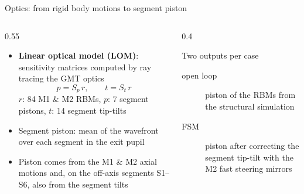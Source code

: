 \documentclass[10pt,aspectratio=169]{beamer}
\begin{document}
\begin{frame}{Optics: from rigid body motions to segment piston}
  \begin{columns}[c]
    \begin{column}{0.55\textwidth}
      \begin{itemize}
        \item \textbf{Linear optical model (LOM)}: sensitivity matrices computed by ray tracing the GMT optics
          \[ p = S_p\,r, \qquad t = S_t\,r \]
          $r$: 84 M1 \& M2 RBMs, $p$: 7 segment pistons, $t$: 14 segment tip-tilts
        \item Segment piston: mean of the wavefront over each segment in the exit pupil
        \item Piston comes from the M1 \& M2 axial motions and, on the off-axis segments S1--S6, also from the segment tilts
      \end{itemize}
    \end{column}
    \begin{column}{0.4\textwidth}
      \begin{alertblock}{Two outputs per case}
        \begin{description}
          \item[open loop] piston of the RBMs from the structural simulation
          \item[FSM] piston after correcting the segment tip-tilt with the M2 fast steering mirrors
        \end{description}
      \end{alertblock}
    \end{column}
  \end{columns}
\end{frame}
\end{document}
